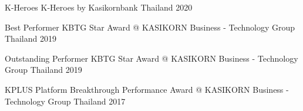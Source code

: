 
\begin{cvhonors}

  \cvhonor
    {K-Heroes} %
    {K-Heroes by Kasikornbank} %
    {Thailand} %
    {2020} %


  \cvhonor
    {Best Performer} %
    {KBTG Star Award @ KASIKORN Business - Technology Group} %
    {Thailand} %
    {2019} %


  \cvhonor
    {Outstanding Performer} %
    {KBTG Star Award @ KASIKORN Business - Technology Group} %
    {Thailand} %
    {2019} %

  \cvhonor
    {KPLUS Platform} %
    {Breakthrough Performance Award @ KASIKORN Business - Technology Group} %
    {Thailand} %
    {2017} %

\end{cvhonors}
